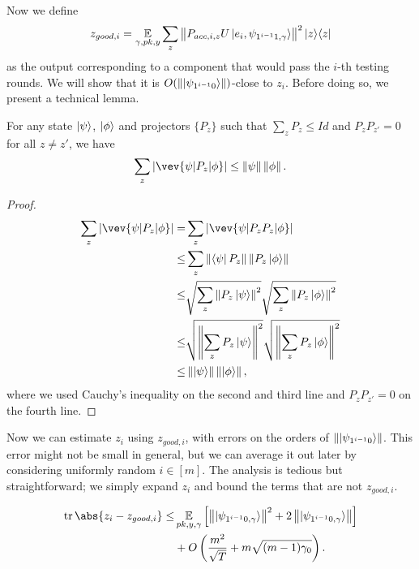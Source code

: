 Now we define
\begin{equation}
	\label{eq:zgoodi-def}
	z_{good, i}=\operatorname*{\mathbb{E}}_{\gamma, pk, y} \sum_z \left\lVert P_{acc,i,z} U\ket{e_i,\psi_{1^{i-1}1,\gamma}}\right\rVert^2|z\rangle\langle z|
\end{equation}
as the output corresponding to a component that would pass the $i$-th testing rounds.
We will show that it is $O(\left\lVert\ket{\psi_{1^{i-1}0}}\right\rVert)$-close to $z_i$.
Before doing so, we present a technical lemma.
\begin{lemma}\label{lem:samp-tech}
	For any state $\ket{\psi}$,  $\ket{\phi}$ and projectors $\{P_z\}$ such that $\sum_z P_z \leq Id$ and $P_z P_{z'} =0 $ for all $z\neq z'$, we have
	$$  \sum_z |\vev{\psi|P_z|\phi}| \leq \norm{\psi}\norm{\phi}. $$
\end{lemma}
\begin{proof}
	\begin{align}
		\sum_z |\vev{\psi|P_z|\phi}| =&\sum_z|\vev{\psi|P_zP_z|\phi}| \nn \\
		\leq& \sum_z \norm{\bra{\psi}P_z} \norm{ P_z\ket{\phi}} \nn \\
		\leq&  \sqrt{\sum_z \norm{P_z\ket{\psi}}^2} \sqrt{\sum_z\norm{P_z\ket{\phi}}^2} \nn \\
		\leq& \sqrt{\norm{\sum_z P_z\ket{\psi}}^2 } \sqrt{\norm{\sum_z P_z\ket{\phi}}^2 } \nn \\
		\leq & \norm{\ket{\psi}}\norm{\ket{\phi}},
	\end{align}
	where we used Cauchy's inequality on the second and third line and $P_z P_{z'} =0 $ on the fourth line.
\end{proof}

Now we can estimate $z_i$ using $z_{good, i}$, with errors on the orders of $\left\lVert\ket{\psi_{1^{i-1}0}}\right\rVert$.
This error might not be small in general,
but we can average it out later by considering uniformly random $i\in[m]$.
The analysis is tedious but straightforward;
we simply expand $z_i$ and bound the terms that are not $z_{good, i}$.

\begin{lemma}
	\label{thm:zi-zgoodi}
	\begin{align*}
	\tr\abs{z_i-z_{good, i}}\leq&\E_{pk, y, \gamma}\L[\norm{\ket{\psi_{1^{i-1}0,\gamma}}}^2+2\norm{\ket{\psi_{1^{i-1}0,\gamma}}}\R]\\
	&+O\L(\frac{m^2}{\sqrt T}+m\sqrt{(m-1)\gamma_0}\R).
	\end{align*}
\end{lemma}

